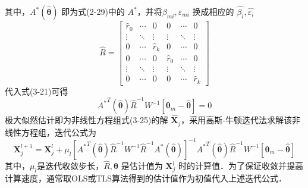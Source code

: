 其中，$A^*(\hat{\bm{\theta}})$ 即为式(2-29)中的 $A^*$，并将$\beta_{mi},\varepsilon_{mi}$ 换成相应的 $\hat{\beta_i},\hat{\varepsilon_i}$
\begin{equation}
	\hat{R} = \left[\begin{array}{ccc|ccc}
		\hat{r}_0 & \cdots & 0 & 0 & \cdots & 0\\
		\vdots & \ddots & \vdots & \vdots & \ddots & \vdots \\
		0 & \cdots & \hat{r}_k & 0 & \cdots & 0 \\ \hline
		0 & \cdots & 0 & \hat{r}_0 & \cdots & 0 \\
		\vdots & \ddots & \vdots & \vdots & \ddots & \vdots \\
		0 & \cdots & 0 & 0 & \cdots  & \hat{r}_k
	\end{array}\right]
\end{equation}
代入式(3-21)可得
\begin{equation}
	{A^*}^T(\hat{\bm{\theta}})\hat{R}^{-1}W^{-1}[\bm{\theta}_m - \hat{\bm{\theta}}] = 0
\end{equation}
极大似然估计即为非线性方程组式(3-25)的解 $\hat{\bm{X}}_j$，采用高斯-牛顿迭代法求解该非线性方程组，迭代公式为
\begin{equation}
	\bm{X}_j^{l+1} = \bm{X}_j^{l} + \mu_l[{A^*}^T(\hat{\bm{\theta}}) \hat{R}^{-1} W^{-1} \hat{R}^{-1} {A^*}(\hat{\bm{\theta}})]^{-1} {A^*}^T(\hat{\bm{\theta}}) \hat{R}^{-1} W^{-1} [\bm{\theta}_m - \hat{\bm{\theta}}]
\end{equation}
其中，$\mu_l$是迭代收敛步长，$\hat{R},\hat{\bm{\theta}}$ 是估计值为 $\bm{X}_j^{l}$ 时的计算值．为了保证收敛并提高计算速度，通常取OLS或TLS算法得到的估计值作为初值代入上述迭代公式．
